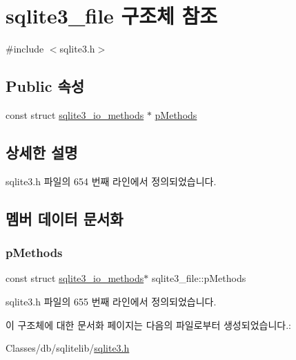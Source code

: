 \hypertarget{structsqlite3__file}{}\section{sqlite3\+\_\+file 구조체 참조}
\label{structsqlite3__file}


{\ttfamily \#include $<$sqlite3.\+h$>$}

\subsection*{Public 속성}
\begin{DoxyCompactItemize}
\item 
const struct \hyperlink{structsqlite3__io__methods}{sqlite3\+\_\+io\+\_\+methods} $\ast$ \hyperlink{structsqlite3__file_adfc58b2d7514112375d7330e2881bc70}{p\+Methods}
\end{DoxyCompactItemize}


\subsection{상세한 설명}


sqlite3.\+h 파일의 654 번째 라인에서 정의되었습니다.



\subsection{멤버 데이터 문서화}
\mbox{\label{structsqlite3__file_adfc58b2d7514112375d7330e2881bc70}} 
\subsubsection{\texorpdfstring{p\+Methods}{pMethods}}
{\footnotesize\ttfamily const struct \hyperlink{structsqlite3__io__methods}{sqlite3\+\_\+io\+\_\+methods}$\ast$ sqlite3\+\_\+file\+::p\+Methods}



sqlite3.\+h 파일의 655 번째 라인에서 정의되었습니다.



이 구조체에 대한 문서화 페이지는 다음의 파일로부터 생성되었습니다.\+:\begin{DoxyCompactItemize}
\item 
Classes/db/sqlitelib/\hyperlink{sqlite3_8h}{sqlite3.\+h}\end{DoxyCompactItemize}
